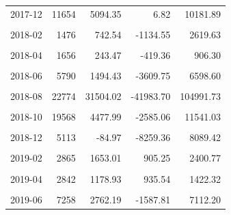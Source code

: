 \begin{longtable}[t]{crrrr}
2017-12 & 11654 & 5094.35 & 6.82 & 10181.89\\
\cellcolor{gray!10}{2018-01} & \cellcolor{gray!10}{2553} & \cellcolor{gray!10}{800.22} & \cellcolor{gray!10}{-734.11} & \cellcolor{gray!10}{2334.55}\\
2018-02 & 1476 & 742.54 & -1134.55 & 2619.63\\
\cellcolor{gray!10}{2018-03} & \cellcolor{gray!10}{2657} & \cellcolor{gray!10}{1360.82} & \cellcolor{gray!10}{792.03} & \cellcolor{gray!10}{1929.62}\\
2018-04 & 1656 & 243.47 & -419.36 & 906.30\\
\cellcolor{gray!10}{2018-05} & \cellcolor{gray!10}{3366} & \cellcolor{gray!10}{773.74} & \cellcolor{gray!10}{-671.10} & \cellcolor{gray!10}{2218.59}\\
2018-06 & 5790 & 1494.43 & -3609.75 & 6598.60\\
\cellcolor{gray!10}{2018-07} & \cellcolor{gray!10}{12652} & \cellcolor{gray!10}{4600.49} & \cellcolor{gray!10}{-2482.73} & \cellcolor{gray!10}{11683.72}\\
2018-08 & 22774 & 31504.02 & -41983.70 & 104991.73\\
\cellcolor{gray!10}{2018-09} & \cellcolor{gray!10}{42251} & \cellcolor{gray!10}{21396.06} & \cellcolor{gray!10}{-15838.76} & \cellcolor{gray!10}{58630.88}\\
2018-10 & 19568 & 4477.99 & -2585.06 & 11541.03\\
\cellcolor{gray!10}{2018-11} & \cellcolor{gray!10}{13014} & \cellcolor{gray!10}{3969.23} & \cellcolor{gray!10}{-25352.55} & \cellcolor{gray!10}{33291.01}\\
2018-12 & 5113 & -84.97 & -8259.36 & 8089.42\\
\cellcolor{gray!10}{2019-01} & \cellcolor{gray!10}{4030} & \cellcolor{gray!10}{1816.75} & \cellcolor{gray!10}{894.67} & \cellcolor{gray!10}{2738.84}\\
2019-02 & 2865 & 1653.01 & 905.25 & 2400.77\\
\cellcolor{gray!10}{2019-03} & \cellcolor{gray!10}{5213} & \cellcolor{gray!10}{5715.79} & \cellcolor{gray!10}{3247.23} & \cellcolor{gray!10}{8184.36}\\
2019-04 & 2842 & 1178.93 & 935.54 & 1422.32\\
\cellcolor{gray!10}{2019-05} & \cellcolor{gray!10}{2963} & \cellcolor{gray!10}{349.12} & \cellcolor{gray!10}{-1330.68} & \cellcolor{gray!10}{2028.91}\\
2019-06 & 7258 & 2762.19 & -1587.81 & 7112.20\\

\end{longtable}
